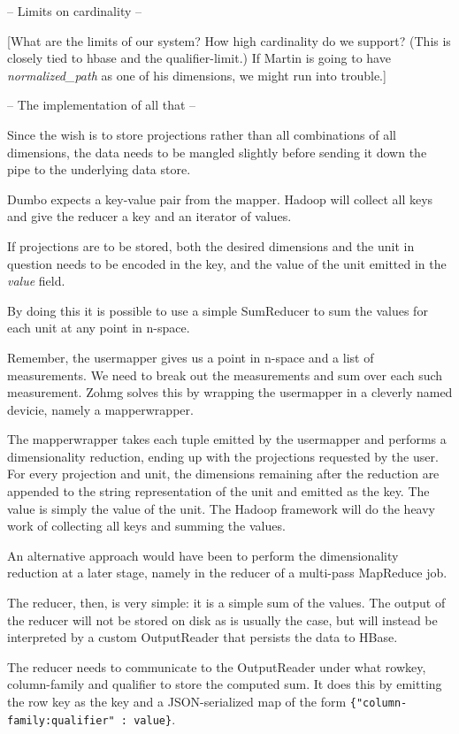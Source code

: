 -- Limits on cardinality --

[What are the limits of our system? How high cardinality do we support? (This
is closely tied to hbase and the qualifier-limit.) If Martin is going to have
\textit{normalized\_path} as one of his dimensions, we might run into trouble.]

-- The implementation of all that --

Since the wish is to store projections rather than all combinations of all
dimensions, the data needs to be mangled slightly before sending it down
the pipe to the underlying data store.

Dumbo expects a key-value pair from the mapper. Hadoop will collect all keys
and give the reducer a key and an iterator of values.

If projections are to be stored, both the desired dimensions and the unit
in question needs to be encoded in the key, and the value of the unit
emitted in the \textit{value} field.

By doing this it is possible to use a simple SumReducer to sum the values
for each unit at any point in n-space.

Remember, the usermapper gives us a point in n-space and a list of
measurements. We need to break out the measurements and sum over each such
measurement. Zohmg solves this by wrapping the usermapper in a cleverly named
devicie, namely a mapperwrapper.

The mapperwrapper takes each tuple emitted by the usermapper and performs a
dimensionality reduction, ending up with the projections requested by the
user. For every projection and unit, the dimensions remaining after the
reduction are appended to the string representation of the unit and emitted
as the key. The value is simply the value of the unit. The Hadoop framework
will do the heavy work of collecting all keys and summing the values.

An alternative approach would have been to perform the dimensionality
reduction at a later stage, namely in the reducer of a multi-pass MapReduce
job.

The reducer, then, is very simple: it is a simple sum of the values. The output
of the reducer will not be stored on disk as is usually the case, but will
instead be interpreted by a custom OutputReader that persists the data to
HBase.

The reducer needs to communicate to the OutputReader under what rowkey,
column-family and qualifier to store the computed sum. It does this by
emitting the row key as the key and a JSON-serialized map of the form
\texttt{\{"column-family:qualifier" : value\}}.

